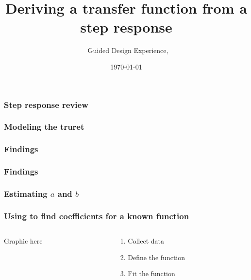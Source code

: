 \documentclass[aspectratio=169]{beamer}
\title{Deriving a transfer function from a step response}
\subtitle{\usnaCourseNumber\ Guided Design Experience, \usnaCourseTerm}
\author{\usnaInstructorShort}
\date{\today}
\begin{document}
\settitlebg
\begin{frame}
\titlepage
\end{frame}

\setslidebg
\begin{frame}
\frametitle{Step response review}
\end{frame}

\begin{frame}
\frametitle{Modeling the truret}
\end{frame}

\begin{frame}
\frametitle{Findings}
\end{frame}

\begin{frame}
\frametitle{Findings}
\end{frame}

\begin{frame}
\frametitle{Estimating $a$ and $b$}
\end{frame}

\begin{frame}
\frametitle{Using \Matlab to find coefficients for a known function}
\begin{columns}
\begin{column}{0.5\textwidth}
Graphic here
\end{column}
\begin{column}{0.5\textwidth}
\begin{enumerate}
\item Collect data
\item Define the function
\item Fit the function
\end{enumerate}
\end{column}
\end{columns}
\end{frame}
\end{document}
